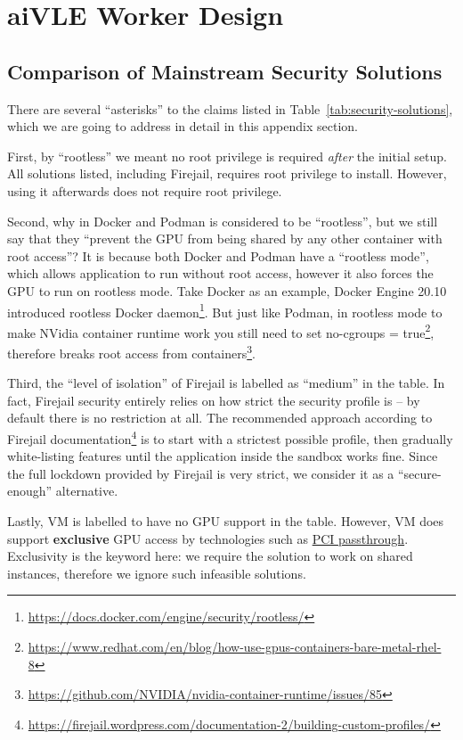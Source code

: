\chapter{aiVLE Worker Design}
\label{appendix:aivle-worker}

\section{Comparison of Mainstream Security Solutions}
\label{as:comparison-of-security-solutions}

There are several ``asterisks'' to the claims listed in Table~\ref{tab:security-solutions}, which we are going to address in detail in this appendix section. 

First, by ``rootless'' we meant no root privilege is required \emph{after} the initial setup. All solutions listed, including Firejail, requires root privilege to install. However, using it afterwards does not require root privilege.

Second, why in Docker and Podman is considered to be ``rootless'', but we still say that they ``prevent the GPU from being shared by any other container with root access''? It is because both Docker and Podman have a ``rootless mode'', which allows application to run without root access, however it also forces the GPU to run on rootless mode. Take Docker as an example, Docker Engine 20.10 introduced rootless Docker daemon\footnote{\href{https://docs.docker.com/engine/security/rootless/}{https://docs.docker.com/engine/security/rootless/}}. But just like Podman, in rootless mode to make NVidia container runtime work you still need to set no-cgroups = true\footnote{\href{https://www.redhat.com/en/blog/how-use-gpus-containers-bare-metal-rhel-8}{https://www.redhat.com/en/blog/how-use-gpus-containers-bare-metal-rhel-8}}, therefore breaks root access from containers\footnote{\href{https://github.com/NVIDIA/nvidia-container-runtime/issues/85}{https://github.com/NVIDIA/nvidia-container-runtime/issues/85}}.

Third, the ``level of isolation'' of Firejail is labelled as ``medium'' in the table. In fact, Firejail security entirely relies on how strict the security profile is – by default there is no restriction at all. The recommended approach according to Firejail documentation\footnote{\href{https://firejail.wordpress.com/documentation-2/building-custom-profiles/}{https://firejail.wordpress.com/documentation-2/building-custom-profiles/}} is to start with a strictest possible profile, then gradually white-listing features until the application inside the sandbox works fine. Since the full lockdown provided by Firejail is very strict, we consider it as a ``secure-enough'' alternative.

Lastly, VM is labelled to have no GPU support in the table. However, VM does support \textbf{exclusive} GPU access by technologies such as \href{https://docs.fedoraproject.org/en-US/Fedora/13/html/Virtualization_Guide/chap-Virtualization-PCI_passthrough.html}{PCI passthrough}. Exclusivity is the keyword here: we require the solution to work on shared instances, therefore we ignore such infeasible solutions.
